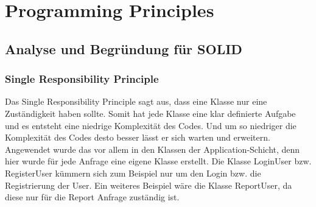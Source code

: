 

\chapter{Programming Principles}
\section{Analyse und Begründung für SOLID}

\subsection{Single Responsibility Principle}
Das Single Responsibility Principle sagt aus, dass eine Klasse nur eine Zuständigkeit haben sollte.
Somit hat jede Klasse eine klar definierte Aufgabe und es entsteht eine niedrige Komplexität des Codes.
Und um so niedriger die Komplexität des Codes desto besser lässt er sich warten und erweitern.
Angewendet wurde das vor allem in den Klassen der Application-Schicht, denn hier wurde für jede Anfrage eine eigene Klasse erstellt.
Die Klasse LoginUser bzw. RegisterUser kümmern sich zum Beispiel nur um den Login bzw. die Registrierung der User.
Ein weiteres Beispiel wäre die Klasse ReportUser, da diese nur für die Report Anfrage zuständig ist.



